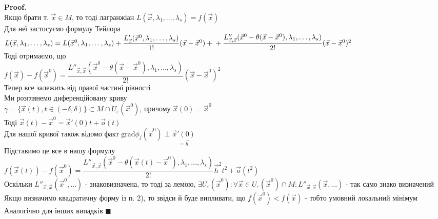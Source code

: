 \documentclass[a4paper, 14pt]{extarticle}
\theoremstyle{theoremdd}
\theoremstyle{theoremdd}
\theoremstyle{theoremdd}
\theoremstyle{theoremdd}
\theoremstyle{theoremdd}
\theoremstyle{theoremdd}
\theoremstyle{theoremdd}
\newenvironment{pf}{\vspace*{-3mm} \textbf{Proof. \\}}{$\blacksquare$}
\begin{document}
\begin{pf}
Якщо брати т. $\vec{x} \in M$, то тоді лагранжіан $L(\vec{x}, \lambda_1, \dots, \lambda_s) = f(\vec{x})$\\
Для неї застосуємо формулу Тейлора\\
$L(\vec{x}, \lambda_1, \dots, \lambda_s) = L(\vec{x}^0, \lambda_1,\dots,\lambda_s) + \dfrac{L'_{\vec{x}}(\vec{x}^0,\lambda_1,\dots,\lambda_s)}{1!}(\vec{x}-\vec{x}^0) + \\ + \dfrac{L''_{\vec{x},\vec{x}}(\vec{x}^0 - \theta(\vec{x}-\vec{x}^0), \lambda_1,\dots,\lambda_s)}{2!}(\vec{x}-\vec{x}^0)^2$\\
Тоді отримаємо, що\\
$f(\vec{x})-f(\vec{x}^0) = \dfrac{L''_{\vec{x},\vec{x}}(\vec{x}^0 - \theta(\vec{x}-\vec{x}^0), \lambda_1,\dots,\lambda_s)}{2!}(\vec{x}-\vec{x}^0)^2$\\
Тепер все залежить від правої частині рівності\\
Ми розглянемо диференційовану криву \\ $\gamma = \{\vec{x}(t), t \in (-\delta,\delta) \} \subset M \cap U_{\varepsilon}(\vec{x}^0)$, причому $\vec{x}(0)=\vec{x}^0$\\
Тоді $\vec{x}(t) - \vec{x}^0 = \vec{x}'(0)t + \vec{o}(t)$\\
Для нашої кривої також відомо факт $\textrm{grad} \phi_j (\vec{x}^0) \perp \underset{=\vec{h}}{\vec{x}'(0)}$\\
Підставимо це все в нашу формулу\\
$f(\vec{x}(t)) -f(\vec{x}^0) = \dfrac{L''_{\vec{x},\vec{x}}(\vec{x}^0 - \theta(\vec{x}(t)-\vec{x}^0), \lambda_1,\dots,\lambda_s)}{2!}\vec{h}^2 t^2 + \vec{o}(t^2)$\\
Оскільки $L''_{\vec{x},\vec{x}}(\vec{x}^0,\dots)$ - знаковизначена, то тоді за лемою, $\exists U_{\varepsilon}(\vec{x}^0): \forall \vec{x} \in U_{\varepsilon}(\vec{x}^0) \cap M: L''_{\vec{x},\vec{x}}(\vec{x},\dots)$ - так само знако визначений\\
Якщо визначимо квадратичну форму із п. 2), то звідси й буде випливати, що $f(\vec{x}^0) < f(\vec{x})$ - тобто умовний локальний мінімум\\
Аналогічно для інших випадків
\end{pf}
\end{document}

